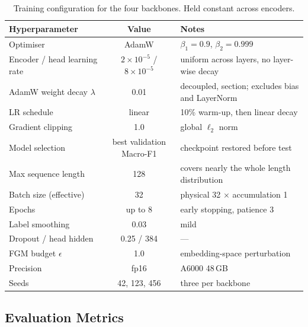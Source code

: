 \documentclass[11pt,a4paper]{article}
\def\cref#1{section}%
\begin{document}
\begin{table}[!htbp]
\centering
\caption{Training configuration for the four backbones. Held constant across encoders.}
\label{tab:hparams}
\small
\begin{tabularx}{\textwidth}{@{}lcX@{}}
\toprule
\textbf{Hyperparameter} & \textbf{Value} & \textbf{Notes} \\
\midrule
Optimiser & AdamW & $\beta_1 = 0.9$, $\beta_2 = 0.999$ \\
Encoder / head learning rate & $2\times10^{-5}$ / $8\times10^{-5}$ & uniform across layers, no layer-wise decay \\
AdamW weight decay $\lambda$ & 0.01 & decoupled, \cref{eq:adamw-update}; excludes bias and LayerNorm \\
LR schedule & linear & 10\% warm-up, then linear decay \\
Gradient clipping & 1.0 & global $\ell_2$ norm \\
Model selection & best validation Macro-F1 & checkpoint restored before test \\
Max sequence length & 128 & covers nearly the whole length distribution \\
Batch size (effective) & 32 & physical 32 $\times$ accumulation 1 \\
Epochs & up to 8 & early stopping, patience 3 \\
Label smoothing & 0.03 & mild \\
Dropout / head hidden & 0.25 / 384 & --- \\
FGM budget $\epsilon$ & 1.0 & embedding-space perturbation \\
Precision & fp16 & A6000 48\,GB \\
Seeds & 42, 123, 456 & three per backbone \\
\bottomrule
\end{tabularx}
\end{table}

\subsection{Evaluation Metrics}
\label{sec:metrics}
\end{document}
